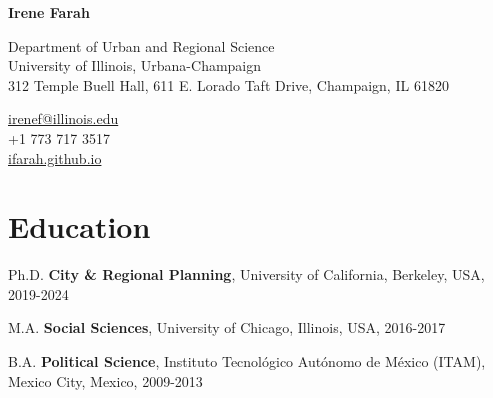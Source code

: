 \documentclass[12pt,letterpaper]{report}
\newcommand{\myname}{Irene Farah}
\newcommand{\namefont}[1]{{\normalfont\bfseries\Huge{#1}}}
\begin{document}
    \raggedright{}

    \namefont{\myname}

    \vspace{1em}
    \begin{minipage}[t]{0.700\textwidth}
        Department of Urban and Regional Science \\
        University of Illinois, Urbana-Champaign \\
       312 Temple Buell Hall, 611 E. Lorado Taft Drive, Champaign, IL 61820
    
    \end{minipage}
    \begin{minipage}[t]{0.295\textwidth}
        \flushright{}
        \href{mailto:irenef@berkeley.edu}{irenef@illinois.edu} \\
        +1 773 717 3517 \\
        \href{https://ifarah.github.io}{ifarah.github.io}\\
    \end{minipage}

    \section*{Education}
    
    \begin{tablist}
      \item[Ph.D.] \tab{}\textbf{City \& Regional Planning}, University of California, Berkeley, USA, 2019-2024 \\
\vspace{.15cm}
\color{gray}
\color{black}
      \item[M.A.] \tab{}\textbf{Social Sciences}, University of Chicago, Illinois, USA, 2016-2017 \\
\color{gray}
\vspace{.15cm}
      \color{black}
      \item[B.A.] \tab{}\textbf{Political Science}, Instituto Tecnológico Autónomo de México (ITAM), Mexico City, Mexico, 2009-2013 \\
\color{gray}
\vspace{.15cm}
    \end{tablist}
\end{document}
